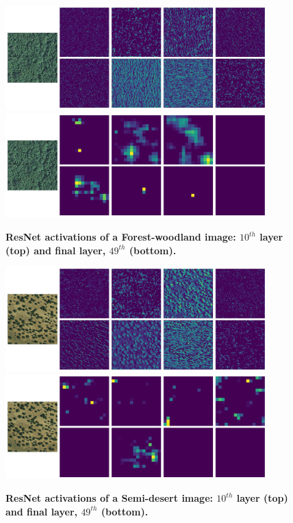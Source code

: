 \begin{figure}[H]
	\centering
	\includegraphics[width=0.9\textwidth]{Figures/activations/forest-woodland_l0_s1_activation_10.png}
	\includegraphics[width=0.9\textwidth]{Figures/activations/forest-woodland_l0_s1_activation_49.png}
	\captionsetup{width=1\linewidth}
	\caption{\textbf{ResNet activations of a Forest-woodland image: $10^{th}$ layer (top) and final layer, $49^{th}$ (bottom).}}
	\label{fig:act_forest_woodland}
\end{figure}

\begin{figure}[H]
	\centering
	\includegraphics[width=0.9\textwidth]{Figures/activations/semi-desert_l0_s1_activation_10.png}
	\includegraphics[width=0.9\textwidth]{Figures/activations/semi-desert_l0_s1_activation_49.png}
	\captionsetup{width=1\linewidth}
	\caption{\textbf{ResNet activations of a Semi-desert image: $10^{th}$ layer (top) and final layer, $49^{th}$ (bottom).}}
	\label{fig:act_semi_desert}
\end{figure}


